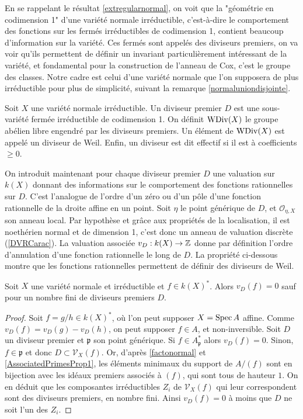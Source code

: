 En se rappelant le résultat \ref{extregularnormal}, on voit que la "géométrie en codimension 1" d'une variété normale irréductible, c'est-à-dire le comportement des fonctions sur les fermés irréductibles de codimension 1, contient beaucoup d'information sur la variété. Ces fermés sont appelés des diviseurs premiers, on va voir qu'ils permettent de définir un invariant particulièrement intéressant de la variété, et fondamental pour la construction de l'anneau de Cox, c'est le groupe des classes. Notre cadre est celui d'une variété normale que l'on supposera de plus irréductible pour plus de simplicité, suivant la remarque \ref{normaluniondisjointe}.

\begin{defn}
Soit $X$ une variété normale irréductible. Un diviseur premier $D$ est une sous-variété fermée irréductible de codimension 1. On définit $\operatorname{WDiv}(X)$ le groupe abélien libre engendré par les diviseurs premiers. Un élément de $\operatorname{WDiv}(X)$ est appelé un diviseur de Weil. Enfin, un diviseur est dit effectif si il est à coefficients $\geq 0$. 
\end{defn}
On introduit maintenant pour chaque diviseur premier $D$ une valuation sur $k(X)$ donnant des informations sur le comportement des fonctions rationnelles sur $D$. C'est l'analogue de l'ordre d'un zéro ou d'un pôle d'une fonction rationnelle de la droite affine en un point. Soit $\eta$ le point générique de $D$, et $\mathcal{O}_{\eta,X}$ son anneau local. Par hypothèse et grâce aux propriétés de la localisation, il est noethérien normal et de dimension 1, c'est donc un anneau de valuation discrète (\ref{DVRCarac}). La valuation associée $v_D:k(X)\rightarrow \mathbb{Z}$ donne par définition l'ordre d'annulation d'une fonction rationnelle le long de $D$. La propriété ci-dessous montre que les fonctions rationnelles permettent de définir des diviseurs de Weil.

\begin{prop}\label{noethérienPWDivBienDef}
Soit $X$ une variété normale et irréductible et $f\in k(X)^*$. Alors $v_D(f)=0$ sauf pour un nombre fini de diviseurs premiers $D$.
\end{prop}
\begin{proof}
Soit $f=g/h\in k(X)^*$, où l'on peut supposer $X=\operatorname{Spec} A$ affine. Comme $v_D(f)=v_D(g)-v_D(h)$, on peut supposer $f\in A$, et non-inversible. Soit $D$ un diviseur premier et $\mathfrak{p}$ son point générique. Si $f\in A_\mathfrak{p}^*$ alors $v_D(f)=0$. Sinon, $f\in \mathfrak{p}$ et donc $D \subset \mathcal{V}_X(f)$. Or, d'après \ref{factonormal} et \ref{AssociatedPrimesProp1}, les éléments minimaux du support de $A/(f)$ sont en bijection avec les idéaux premiers associés à $(f)$, qui sont tous de hauteur $1$. On en déduit que les composantes irréductibles $Z_i$ de $\mathcal{V}_X(f)$ qui leur correspondent sont des diviseurs premiers, en nombre fini. Ainsi $v_D(f)=0$ à moins que $D$ ne soit l'un des $Z_i$.
\end{proof}


